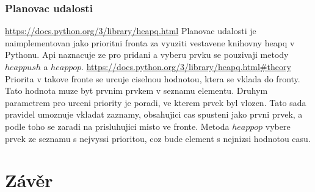 \subsection{Planovac udalosti}
\url{https://docs.python.org/3/library/heapq.html}
Planovac udalosti je naimplementovan jako prioritni fronta za vyuziti vestavene knihovny heapq v Pythonu. Api naznacuje ze pro pridani a vyberu prvku se pouzivaji metody $heappush$ a $heappop$. \url{https://docs.python.org/3/library/heapq.html#theory} Priorita v takove fronte se urcuje ciselnou hodnotou, ktera se vklada do fronty. Tato hodnota muze byt prvnim prvkem v seznamu elementu. Druhym parametrem pro urceni priority je poradi, ve kterem prvek byl vlozen. Tato sada pravidel umoznuje vkladat zaznamy, obsahujici cas spusteni jako prvni prvek, a podle toho se zaradi na prisluhujici misto ve fronte. Metoda $heappop$ vybere prvek ze seznamu s nejvyssi prioritou, coz bude element s nejnizsi hodnotou casu.
\chapter{Závěr}
\label{zaver}
